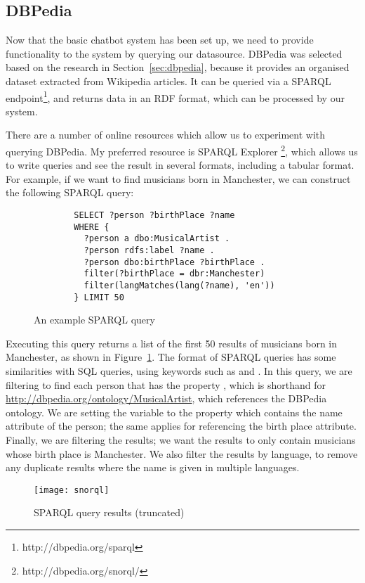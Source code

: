 \subsection{DBPedia}
Now that the basic chatbot system has been set up, we need to provide functionality to the system by querying our datasource. DBPedia was selected based on the research in Section~\ref{sec:dbpedia}, because it provides an organised dataset extracted from Wikipedia articles. It can be queried via a SPARQL endpoint\footnote{http://dbpedia.org/sparql}, and returns data in an RDF format, which can be processed by our system.

There are a number of online resources which allow us to experiment with querying DBPedia. My preferred resource is SPARQL Explorer \footnote{http://dbpedia.org/snorql/}, which allows us to write queries and see the result in several formats, including a tabular format. For example, if we want to find musicians born in Manchester, we can construct the following SPARQL query:
\begin{figure}[h]
	\begin{lstlisting}
		SELECT ?person ?birthPlace ?name
		WHERE {
		  ?person a dbo:MusicalArtist .
		  ?person rdfs:label ?name .
		  ?person dbo:birthPlace ?birthPlace .
		  filter(?birthPlace = dbr:Manchester)
		  filter(langMatches(lang(?name), 'en'))
		} LIMIT 50 
	\end{lstlisting}
	\caption{An example SPARQL query}
	\label{fig:sparql1}
\end{figure}

Executing this query returns a list of the first 50 results of musicians born in Manchester, as shown in Figure~\ref{fig:sparql1}. The format of SPARQL queries has some similarities with SQL queries, using keywords such as  and . In this query, we are filtering to find each person that has the property , which is shorthand for \url{http://dbpedia.org/ontology/MusicalArtist}, which references the DBPedia ontology. We are setting the variable  to the property  which contains the name attribute of the person; the same applies for  referencing the birth place attribute. Finally, we are filtering the results; we want the results to only contain musicians whose birth place is Manchester. We also filter the  results by language, to remove any duplicate results where the name is given in multiple languages.

\begin{figure}[h]
	\centering
	\texttt{[image: snorql]}
	\caption{SPARQL query results (truncated)}
	\label{fig:sparql2}
\end{figure}


